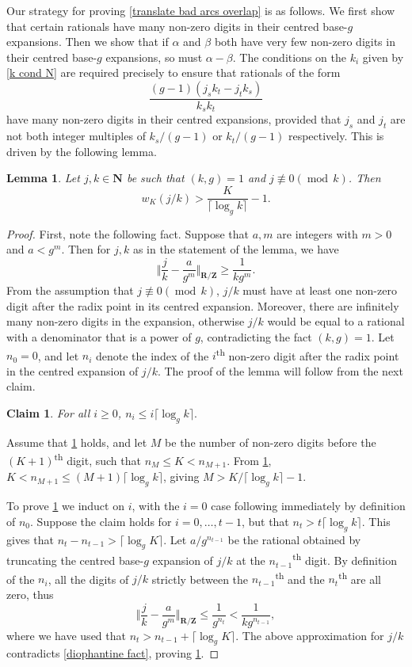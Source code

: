 \documentclass[hidelinks,11pt,reqno]{amsart}
\renewcommand{\leq}{\leqslant}
\renewcommand{\geq}{\geqslant}
\newcommand{\Z}{\ensuremath{\mathbf{Z}}}
\newcommand{\N}{\ensuremath{\mathbf{N}}}
\newcommand{\R}{\ensuremath{\mathbf{R}}}
\newcommand{\sth}{\textsuperscript{th }}
\newcommand{\nequiv}{\not\equiv}
\newtheorem{lemma}[prop]{Lemma}
\newtheorem{claim}[prop]{Claim}
\theoremstyle{remark}
\newcommand{\md}[1]{\ensuremath{(\operatorname{mod}\, #1)}}
\begin{document}
Our strategy for proving \cref{translate bad arcs overlap} is as follows. We first show that certain rationals have many non-zero digits in their centred base-$g$ expansions. Then we show that if $\alpha$ and $\beta$ both have very few non-zero digits in their centred base-$g$ expansions, so must $\alpha-\beta$. The conditions on the $k_{i}$ given by \cref{k cond N} are required precisely to ensure that rationals of the form 
\[\frac{(g-1)(j_{s}k_{t}-j_{t}k_{s})}{k_{s}k_{t}}\]
have many non-zero digits in their centred expansions, provided that $j_{s}$ and $j_{t}$ are not both integer multiples of $k_{s}/(g-1)$ or $k_{t}/(g-1)$ respectively. This is driven by the following lemma.
\begin{lemma}\label{1/k reciprocal}
    Let $j,k\in \N$ be such that $(k,g)=1$ and $j\nequiv 0\md{k}$. Then
    \[w_{K}(j/k)> \frac{K}{\lceil \log_{g}k\rceil}-1.\]
 \end{lemma}
\begin{proof}
    First, note the following fact. Suppose that $a,m$ are integers with $m>0$ and $a<g^{m}$. Then for $j,k$ as in the statement of the lemma, we have
    \begin{equation}\label{diophantine fact}
        \Big \Vert \frac{j}{k}-\frac{a}{g^{m}}\Big \Vert_{\R/\Z}\geq \frac{1}{kg^{m}}. 
    \end{equation}
    From the assumption that $j\nequiv 0\md{k}$, $j/k$ must have at least one non-zero digit after the radix point in its centred expansion. Moreover, there are infinitely many non-zero digits in the expansion, otherwise $j/k$ would be equal to a rational with a denominator that is a power of $g$, contradicting the fact $(k,g)=1$. Let $n_{0}=0$, and let $n_{i}$ denote the index of the $i$\sth non-zero digit after the radix point in the centred expansion of $j/k$. The proof of the lemma will follow from the next claim.
    \begin{claim}\label{claim 1/k}
    For all $i\geq 0$, $n_{i}\leq i\lceil \log_{g}k \rceil.$
    \end{claim}
    Assume that \cref{claim 1/k} holds, and let $M$ be the number of non-zero digits before the $(K+1)$\sth digit, such that $n_{M}\leq K< n_{M+1}$. From \cref{claim 1/k}, $K<n_{M+1}\leq (M+1)\lceil\log_{g} k\rceil$, giving $M>K/\lceil \log_{g} k\rceil -1$. 

    To prove \cref{claim 1/k} we induct on $i$, with the $i=0$ case following immediately by definition of $n_{0}$. Suppose the claim holds for $i=0,\ldots, t-1$, but that $n_{t}>t\lceil \log_{g} k\rceil$. This gives that $n_{t}-n_{t-1}>\lceil \log_{g}K\rceil$. Let $a/g^{n_{t-1}}$ be the rational obtained by truncating the centred base-$g$ expansion of $j/k$ at the $n_{t-1}$\sth digit. By definition of the $n_{i}$, all the digits of $j/k$ strictly between the $n_{t-1}$\sth and the $n_{t}$\sth are all zero, thus
    \[\Big \Vert \frac{j}{k}-\frac{a}{g^{m}}\Big \Vert_{\R/\Z}\leq \frac{1}{g^{n_{t}}}<\frac{1}{kg^{n_{t-1}}},\]
    where we have used that $n_{t}>n_{t-1}+\lceil \log_{g}K\rceil$. The above approximation for $j/k$ contradicts \cref{diophantine fact}, proving \cref{claim 1/k}.
\end{proof} 
\end{document}
